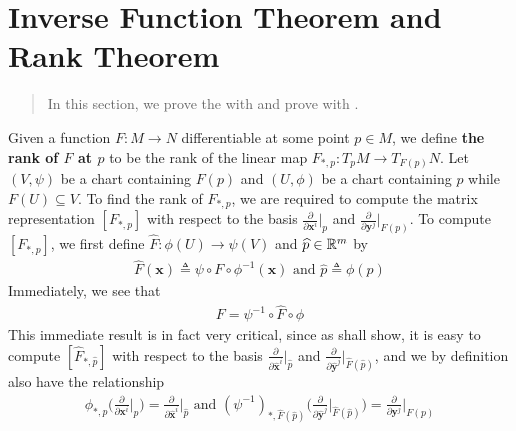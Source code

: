 \documentclass{report}
\begin{document}
\section{Inverse Function Theorem and Rank Theorem} 
\begin{abstract}
In this section, we prove the  with  and prove   with . 
\end{abstract}
\begin{mdframed}
Given a function $F:M\rightarrow N$ differentiable at some point $p\in  M$, we define \textbf{the rank of $F$ at $p$} to be the rank of the linear map $F_{*,p}:T_pM\rightarrow T_{F(p)}N$. Let $(V,\psi)$ be a  chart containing $F(p)$ and $(U,\phi)$ be a chart containing $p$ while  $F(U)\subseteq V$. To find the rank of $F_{*,p}$, we are required to compute the matrix representation $[F_{*,p}]$ with respect to the basis $ \frac{\partial }{\partial \textbf{x}^i}|_p  $ and  $\frac{\partial }{\partial \textbf{y}^j}|_{F(p)}$. To compute $[F_{*,p}]$, we first define $\widehat{F}:\phi (U)\rightarrow \psi (V)$ and $\widehat{p}\in\mathbb{R}^m$ by 
\begin{align*}
\widehat{F}(\textbf{x})\triangleq \psi \circ F \circ \phi ^{-1}(\textbf{x})\text{ and }\widehat{p}\triangleq \phi (p)
\end{align*}
Immediately, we see that 
\begin{align}
\label{cri}
F= \psi^{-1}\circ \widehat{F}\circ \phi 
\end{align}
This immediate result  is in fact very critical, since as shall show, it is easy to compute $[\widehat{F}_{*,\widehat{p}}]$ with respect to the basis $\frac{\partial }{\partial \widehat{\textbf{x}}^i}|_{\widehat{p}}$ and $\frac{\partial }{\partial \widehat{\textbf{y}}^j}|_{\widehat{F}(\widehat{p})}$, and we by definition also have the relationship 
\begin{align}
\label{rel}
  \phi_{*,p}\Big( \frac{\partial }{\partial \textbf{x}^i}\Big|_p \Big)= \frac{\partial }{\partial \widehat{\textbf{x}}^i}\Big|_{\widehat{p}}\text{ and } (\psi^{-1})_{*,\widehat{F}(\widehat{p})} \Big( \frac{\partial }{\partial \widehat{\textbf{y}}^j}\Big|_{\widehat{F}(\widehat{p})} \Big)  = \frac{\partial }{\partial \textbf{y}^j} \Big|_{F(p)}
\end{align}

\end{mdframed}
\end{document}
